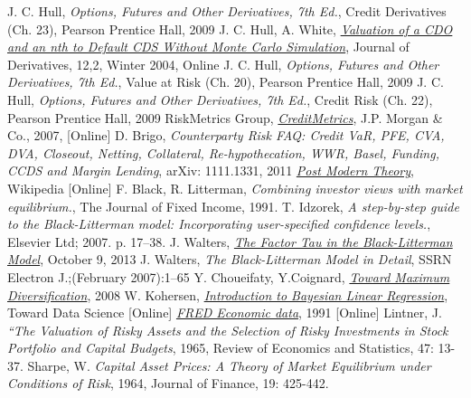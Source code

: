 \begin{thebibliography}{9}
 J. C. Hull, \emph{Options, Futures and Other Derivatives, 7th Ed.}, Credit Derivatives (Ch. 23), Pearson Prentice Hall, 2009
 J. C. Hull, A. White, \href{http://www-2.rotman.utoronto.ca/~hull/downloadablepublications/HullWhiteCDOPaper.pdf}{\emph{Valuation of a CDO and an nth to Default CDS Without Monte Carlo Simulation}}, Journal of Derivatives, 12,2, Winter 2004,  Online 
 J. C. Hull, \emph{Options, Futures and Other Derivatives, 7th Ed.}, Value at Risk (Ch. 20), Pearson Prentice Hall, 2009
 J. C. Hull, \emph{Options, Futures and Other Derivatives, 7th Ed.}, Credit Risk (Ch. 22), Pearson Prentice Hall, 2009
RiskMetrics Group, \href{https://www.msci.com/documents/10199/93396227-d449-4229-9143-24a94dab122f}{\emph{CreditMetrics}}, J.P. Morgan \& Co., 2007, [Online]
 D. Brigo, \emph{Counterparty Risk FAQ: Credit VaR, PFE, CVA, DVA, Closeout, Netting, Collateral, Re-hypothecation, WWR, Basel, Funding, CCDS and Margin Lending}, arXiv: 1111.1331, 2011
\href{https://en.wikipedia.org/wiki/Post-modern_portfolio_theory}{\emph{Post Modern Theory}}, Wikipedia [Online]
 F. Black, R. Litterman, \emph{Combining investor views with market equilibrium.}, The Journal of Fixed Income, 1991.
 T. Idzorek, \emph{A step-by-step guide to the Black-Litterman model: Incorporating user-specified confidence levels.}, Elsevier Ltd; 2007. p. 17–38.
 J. Walters, \href{https://ssrn.com/abstract=1701467}{\emph{The Factor Tau in the Black-Litterman Model}}, October 9, 2013
 J. Walters, \emph{The Black-Litterman Model in Detail}, SSRN Electron J.;(February 2007):1–65
 Y. Choueifaty, Y.Coignard, \href{ https://www.tobam.fr/wp-content/uploads/2014/12/TOBAM-JoPM-Maximum-Div-2008.pdf}{\emph{Toward Maximum Diversification}}, 2008
W. Kohersen, \href{https://towardsdatascience.com/introduction-to-bayesian-linear-regression-e66e60791ea7}{\emph{Introduction to Bayesian Linear Regression}}, Toward Data Science [Online]
\href{https://fred.stlouisfed.org/}{\emph{FRED Economic data}}, 1991 [Online]
 Lintner, J. \emph{“The Valuation of Risky Assets and the Selection of Risky Investments in Stock Portfolio and Capital Budgets}, 1965, Review of Economics and Statistics, 47: 13-37.
 Sharpe, W. \emph{Capital Asset Prices: A Theory of Market Equilibrium under Conditions of Risk}, 1964, Journal of Finance, 19: 425-442.

\end{thebibliography}
